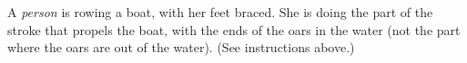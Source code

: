 A \emph{person} is rowing a boat, with her feet braced.
She is doing the part of the stroke that propels the boat,
with the ends of the oars in the water (not the part where
the oars are out of the water).
(See instructions above.)
